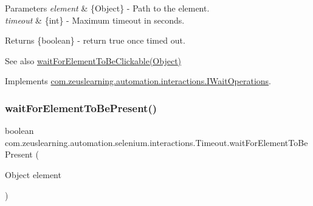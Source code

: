 \begin{DoxyParams}{Parameters}
{\em element} & \{Object\} -\/ Path to the element. \\
\hline
{\em timeout} & \{int\} -\/ Maximum timeout in seconds.\\
\hline
\end{DoxyParams}
\begin{DoxyReturn}{Returns}
\{boolean\} -\/ return {\ttfamily true} once timed out.
\end{DoxyReturn}
\begin{DoxySeeAlso}{See also}
\hyperlink{classcom_1_1zeuslearning_1_1automation_1_1selenium_1_1interactions_1_1Timeout_a6c5ac29cf210e232ac851ebe52b9c226}{wait\+For\+Element\+To\+Be\+Clickable(\+Object)} 
\end{DoxySeeAlso}


Implements \hyperlink{interfacecom_1_1zeuslearning_1_1automation_1_1interactions_1_1IWaitOperations_a8b6cc8c4332c681818630d1665f79c44}{com.\+zeuslearning.\+automation.\+interactions.\+I\+Wait\+Operations}.

\hypertarget{classcom_1_1zeuslearning_1_1automation_1_1selenium_1_1interactions_1_1Timeout_a5b1fb9f2a2d0d61ec2b882269a3826d5}{}\label{classcom_1_1zeuslearning_1_1automation_1_1selenium_1_1interactions_1_1Timeout_a5b1fb9f2a2d0d61ec2b882269a3826d5} 
\subsubsection{\texorpdfstring{wait\+For\+Element\+To\+Be\+Present()}{waitForElementToBePresent()}\hspace{0.1cm}{\footnotesize\ttfamily [1/2]}}
{\footnotesize\ttfamily boolean com.\+zeuslearning.\+automation.\+selenium.\+interactions.\+Timeout.\+wait\+For\+Element\+To\+Be\+Present (\begin{DoxyParamCaption}\item[{Object}]{element }\end{DoxyParamCaption})\hspace{0.3cm}{\ttfamily [inline]}}

